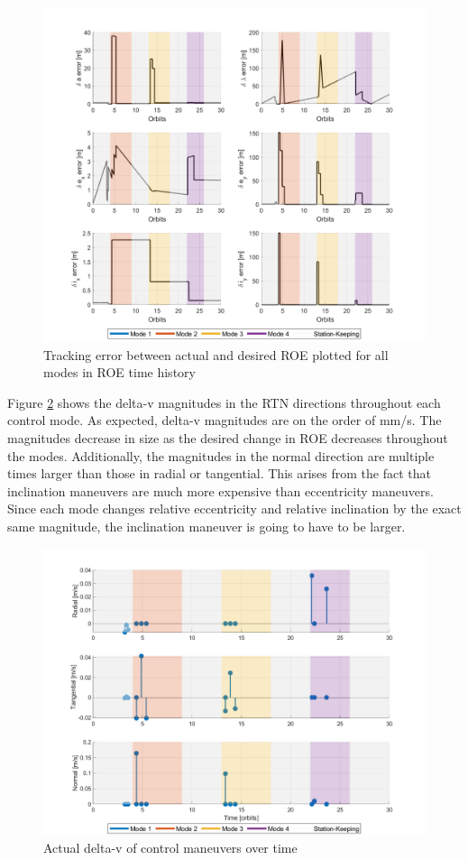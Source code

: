 \begin{figure}[H]
    \centering
    \includegraphics[width=0.75\linewidth]{sim/figures/PS5/ROE_error_over_time_modes_SV3.png}
    \caption{Tracking error between actual and desired ROE plotted for all modes in ROE time history}
    \label{fig:roe_error_time_modes}
\end{figure}

Figure \ref{fig:delta_v_modes} shows the delta-v magnitudes in the RTN directions throughout each control mode. As expected, delta-v magnitudes are on the order of mm/s. The magnitudes decrease in size as the desired change in ROE decreases throughout the modes. Additionally, the magnitudes in the normal direction are multiple times larger than those in radial or tangential. This arises from the fact that inclination maneuvers are much more expensive than eccentricity maneuvers. Since each mode changes relative eccentricity and relative inclination by the exact same magnitude, the inclination maneuver is going to have to be larger. 
\begin{figure}[H]
    \centering
    \includegraphics[width=0.75\linewidth]{sim/figures/PS5/delta_v_timeline_modes_SV3.png}
    \caption{Actual delta-v of control maneuvers over time}
    \label{fig:delta_v_modes}
\end{figure}

